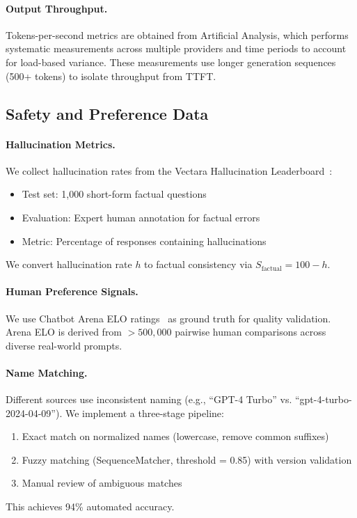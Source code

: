 \paragraph{Output Throughput.}
Tokens-per-second metrics are obtained from Artificial Analysis, which performs systematic measurements across multiple providers and time periods to account for load-based variance. These measurements use longer generation sequences (500+ tokens) to isolate throughput from TTFT.

\subsection{Safety and Preference Data}

\paragraph{Hallucination Metrics.}
We collect hallucination rates from the Vectara Hallucination Leaderboard~\cite{vectara2024hallucination}:
%
\begin{itemize}[nosep]
\item Test set: 1,000 short-form factual questions
\item Evaluation: Expert human annotation for factual errors
\item Metric: Percentage of responses containing hallucinations
\end{itemize}
%
We convert hallucination rate $h$ to factual consistency via $S_{\text{factual}} = 100 - h$.

\paragraph{Human Preference Signals.}
We use Chatbot Arena ELO ratings~\cite{zheng2023arena} as ground truth for quality validation. Arena ELO is derived from $>500{,}000$ pairwise human comparisons across diverse real-world prompts.

\paragraph{Name Matching.}
Different sources use inconsistent naming (e.g., ``GPT-4 Turbo'' vs. ``gpt-4-turbo-2024-04-09''). We implement a three-stage pipeline:
%
\begin{enumerate}[nosep]
\item Exact match on normalized names (lowercase, remove common suffixes)
\item Fuzzy matching (SequenceMatcher, threshold = 0.85) with version validation
\item Manual review of ambiguous matches
\end{enumerate}
%
This achieves 94\% automated accuracy.

